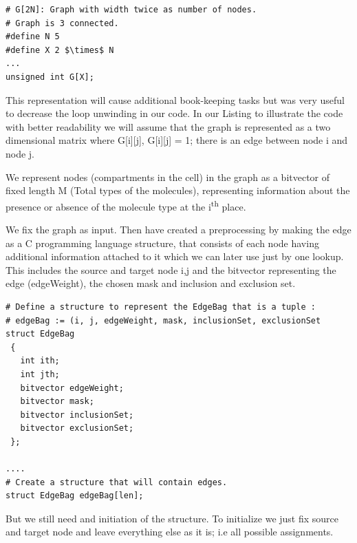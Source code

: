 \documentclass[preprint,12pt]{elsarticle}
\begin{document}
\begin{lstlisting}[mathescape,
  breaklines,
  frame=single,
  caption= \textbf{Graph encoding.}
]
# G[2N]: Graph with width twice as number of nodes.
# Graph is 3 connected.
#define N 5
#define X 2 $\times$ N
...
unsigned int G[X];
\end{lstlisting}

This representation will cause additional book-keeping tasks but was very useful to decrease the loop unwinding in our code. In our Listing to illustrate the code with better readability we will assume that the graph is represented as a two dimensional matrix where G[i][j], G[i][j] = 1; there is an edge between node i and node j.


We represent nodes (compartments in the cell) in the graph as a bitvector of fixed length M (Total types of the molecules), representing information about the presence or absence of the molecule type at the i\textsuperscript{th} place.

We fix the graph as input. Then have created a preprocessing by making the edge as a C programming language structure, that consists of each node having additional information attached to it which we can later use just by one lookup. This includes the source and target node i,j and the bitvector representing the edge (edgeWeight), the chosen mask and inclusion and exclusion set.   

\begin{lstlisting}[mathescape,
  breaklines,
  frame=single,
  caption= \textbf{Necessary condition property.}
]
# Define a structure to represent the EdgeBag that is a tuple :
# edgeBag := (i, j, edgeWeight, mask, inclusionSet, exclusionSet
struct EdgeBag
 {
   int ith;
   int jth;
   bitvector edgeWeight;
   bitvector mask;
   bitvector inclusionSet;
   bitvector exclusionSet;
 };
 
....
# Create a structure that will contain edges. 
struct EdgeBag edgeBag[len];     
\end{lstlisting}

But we still need and initiation of the structure. To initialize we just fix source and target  node and leave everything else as it is; i.e all possible assignments. 
\end{document}
